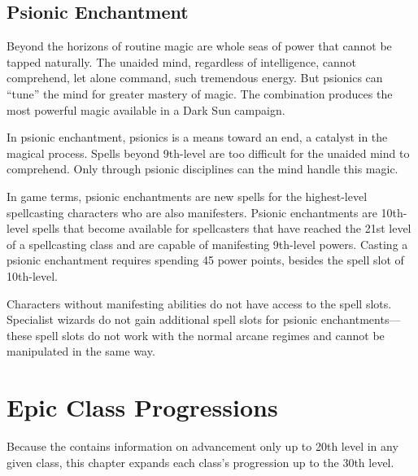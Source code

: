 

\subsection{Psionic Enchantment}
Beyond the horizons of routine magic are whole seas of power that cannot be tapped naturally. The unaided mind, regardless of intelligence, cannot comprehend, let alone command, such tremendous energy. But psionics can ``tune'' the mind for greater mastery of magic. The combination produces the most powerful magic available in a {\tableheader Dark Sun} campaign.

In psionic enchantment, psionics is a means toward an end, a catalyst in the magical process. Spells beyond 9th-level are too difficult for the unaided mind to comprehend. Only through psionic disciplines can the mind handle this magic.

In game terms, psionic enchantments are new spells for the highest-level spellcasting characters who are also manifesters. Psionic enchantments are 10th-level spells that become available for spellcasters that have reached the 21st level of a spellcasting class and are capable of manifesting 9th-level powers. Casting a psionic enchantment requires spending 45 power points, besides the spell slot of 10th-level.

Characters without manifesting abilities do not have access to the spell slots. Specialist wizards do not gain additional spell slots for psionic enchantments---these spell slots do not work with the normal arcane regimes and cannot be manipulated in the same way.

\section{Epic Class Progressions}
Because the  contains information on advancement only up to 20th level in any given class, this chapter expands each class's progression up to the 30th level.




